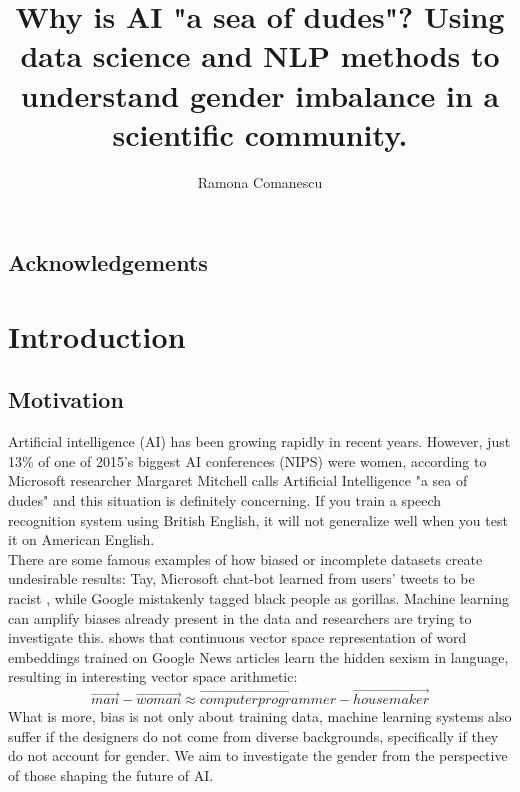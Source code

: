 \documentclass[bsc,frontabs,twoside,singlespacing,parskip,deptreport]{infthesis}     %
\begin{document}
\title{Why is AI "a sea of dudes"? Using data science and NLP methods to understand gender imbalance in a scientific community.}

\author{Ramona Comanescu}





\maketitle

\section*{Acknowledgements}


\chapter{Introduction}
\section{Motivation}
Artificial intelligence (AI) has been growing rapidly in recent years. However, just 13\% of one of 2015's biggest AI conferences (NIPS) were women, according to \cite{seaofdudes}
Microsoft researcher Margaret Mitchell calls Artificial Intelligence "a sea of dudes" and this situation is definitely concerning. If you train a speech recognition system using British English, it will not generalize well when you test it on American English. \\
There are some famous examples of how biased or incomplete datasets create undesirable results: Tay, Microsoft chat-bot learned from users' tweets to be racist \citep{tay}, while Google mistakenly tagged black people as gorillas\citep{gorilla}. Machine learning can amplify biases already present in the data and researchers are trying to investigate this. \cite{homemaker} shows that continuous vector space representation of word embeddings trained on Google News articles learn the hidden sexism in language, resulting in interesting vector space arithmetic:
\begin{equation*}
\overrightarrow{man} - \overrightarrow{woman} \approx \overrightarrow{computer programmer} - \overrightarrow{housemaker}
\end{equation*}
What is more, bias is not only about training data, machine learning systems also suffer if the designers do not come from diverse backgrounds, specifically if they do not account for gender. We aim to investigate the gender from the perspective of those shaping the future of AI.
\end{document}
